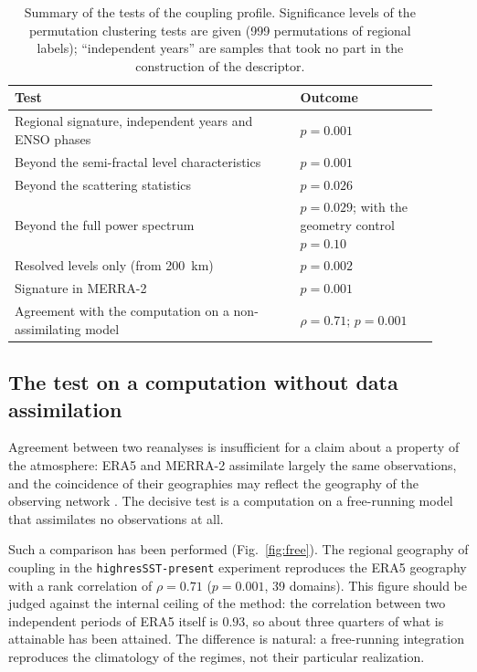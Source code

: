 \documentclass[11pt,a4paper]{article}
\begin{document}
\begin{table}[t]
\centering
\caption{Summary of the tests of the coupling profile. Significance levels of the permutation clustering tests are given (999 permutations of regional labels); ``independent years'' are samples that took no part in the construction of the descriptor.}
\label{tab:tests}
\small
\begin{tabular}{@{}p{0.62\linewidth}p{0.30\linewidth}@{}}
\toprule
Test & Outcome\\
\midrule
Regional signature, independent years and ENSO phases & $p=0.001$\\
Beyond the semi-fractal level characteristics \cite{Krenke2019} & $p=0.001$\\
Beyond the scattering statistics \cite{Cheng2024} & $p=0.026$\\
Beyond the full power spectrum & $p=0.029$; with the geometry control $p=0.10$\\
Resolved levels only (from 200~km) & $p=0.002$\\
Signature in MERRA-2 & $p=0.001$\\
Agreement with the computation on a non-assimilating model & $\rho=0.71$; $p=0.001$\\
\bottomrule
\end{tabular}
\end{table}

\subsection{The test on a computation without data assimilation}

Agreement between two reanalyses is insufficient for a claim about a property of the atmosphere: ERA5 and MERRA-2 assimilate largely the same observations, and the coincidence of their geographies may reflect the geography of the observing network \cite{BonavitaLaloyaux2020}. The decisive test is a computation on a free-running model that assimilates no observations at all.

Such a comparison has been performed (Fig.~\ref{fig:free}). The regional geography of coupling in the \texttt{highresSST-present} experiment reproduces the ERA5 geography with a rank correlation of $\rho=0.71$ ($p=0.001$, 39 domains). This figure should be judged against the internal ceiling of the method: the correlation between two independent periods of ERA5 itself is $0.93$, so about three quarters of what is attainable has been attained. The difference is natural: a free-running integration reproduces the climatology of the regimes, not their particular realization.
\end{document}
